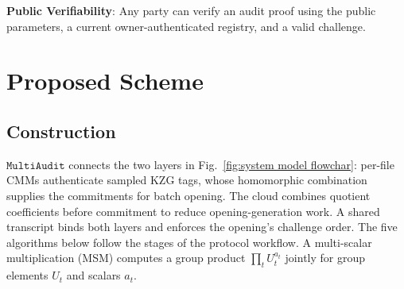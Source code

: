 \documentclass[lettersize,journal]{IEEEtran}
\newcommand{\MultiAudit}{\ensuremath{\mathtt{MultiAudit}}}
\begin{document}
\textbf{Public Verifiability}: Any party can verify an audit proof using the public parameters, a current owner-authenticated registry, and a valid challenge.

\section{Proposed Scheme}

\subsection{Construction}
\label{subsec:construction}

\MultiAudit{} connects the two layers in Fig.~\ref{fig:system model flowchar}: per-file CMMs authenticate sampled KZG tags, whose homomorphic combination supplies the commitments for batch opening. The cloud combines quotient coefficients before commitment to reduce opening-generation work. A shared transcript binds both layers and enforces the opening's challenge order. The five algorithms below follow the stages of the protocol workflow. A multi-scalar multiplication (MSM) computes a group product $\prod_t U_t^{a_t}$ jointly for group elements $U_t$ and scalars $a_t$.
\end{document}
